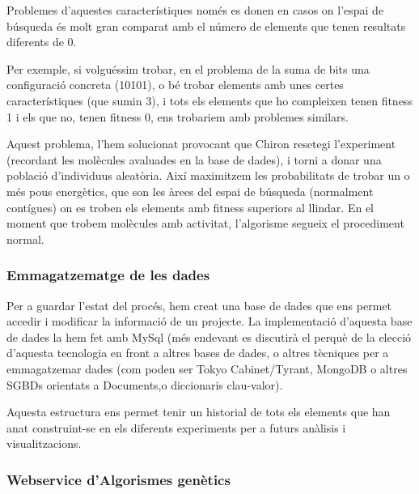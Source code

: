 \documentclass[titlepage,a4paper,12pt]{book}
\begin{document}
Problemes d'aquestes característiques només es donen en casos on l'espai de
búsqueda és molt gran comparat amb el número de elements que tenen resultats
diferents de 0.

Per exemple, si volguéssim trobar, en el problema de la suma de bits una
configuració concreta (10101), o bé trobar elements amb unes certes
característiques (que sumin 3), i tots els elements que ho compleixen tenen
fitness 1 i els que no, tenen fitness 0, ens trobariem amb problemes similars.

Aquest problema, l'hem solucionat provocant que Chiron resetegi l'experiment
(recordant les molècules avaluades en la base de dades), i torni a donar una
població d'individuus aleatòria.  Així maximitzem les probabilitats de trobar un
o més pous energètics, que son les àrees del espai de búsqueda (normalment
contígues) on es troben els elements amb fitness superiors al llindar.  En el
moment que trobem molècules amb activitat, l'algorisme segueix el procediment
normal.

\subsubsection{Emmagatzematge de les dades} %
\label{ssub:Emmagatzematge de les dades}

Per a guardar l'estat del procés, hem creat una base de dades que ens permet
accedir i modificar la informació de un projecte.  La implementació d'aquesta
base de dades la hem fet amb MySql (més endevant es discutirà el perquè de la
elecció d'aquesta tecnologia en front a altres bases de dades, o altres
tècniques per a emmagatzemar dades (com poden ser Tokyo Cabinet/Tyrant, MongoDB
o altres SGBDs orientats a Documents,o diccionaris clau-valor).

\lstset{language=sql, tabsize=2}
\lstset{commentstyle=\textit}


Aquesta estructura ens permet tenir un historial de tots els elements que han
anat construint-se en els diferents experiments per a futurs anàlisis i
visualitzacions.

\subsubsection{Webservice d'Algorismes genètics} %
\label{ssub:Webservice d'Algorismes genetics}
\end{document}
